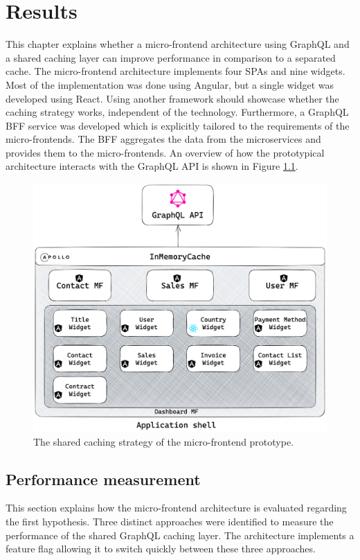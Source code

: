 \chapter{Results}\label{chapter:results}

This chapter explains whether a micro-frontend architecture using GraphQL and a shared caching layer can improve performance in comparison to a separated cache. The micro-frontend architecture implements four \acp{SPA} and nine widgets. Most of the implementation was done using Angular, but a single widget was developed using React. Using another framework should showcase whether the caching strategy works, independent of the technology. Furthermore, a GraphQL \ac{BFF} service was developed which is explicitly tailored to the requirements of the micro-frontends. The \ac{BFF} aggregates the data from the microservices and provides them to the micro-frontends. An overview of how the prototypical architecture interacts with the GraphQL \ac{API} is shown in Figure \ref{fig:results:micro-frontend-prototype}.

\ifshowImages
\begin{figure}[H]
  \centering
  \includegraphics[width=0.7\linewidth]{images/results/micro-frontend-prototype.png}
  \caption{The shared caching strategy of the micro-frontend prototype.}\label{fig:results:micro-frontend-prototype}
\end{figure}
\fi

\section{Performance measurement}\label{section:results:performance-measurement}

This section explains how the micro-frontend architecture is evaluated regarding the first hypothesis. Three distinct approaches were identified to measure the performance of the shared GraphQL caching layer. The architecture implements a feature flag allowing it to switch quickly between these three approaches.

